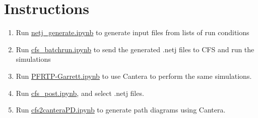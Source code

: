\documentclass{article}
\begin{document}
\section*{Instructions}
\begin{enumerate}
    \item Run \href{netj_generate.ipynb}{netj\_generate.ipynb} to generate input files from lists of run conditions
    \item Run \href{cfs_batchrun.ipynb}{cfs\_batchrun.ipynb} to send the generated .netj files to CFS and run the simulations
    \item Run \href{PFRTP-Garrett.ipynb}{PFRTP-Garrett.ipynb} to use Cantera to perform the same simulations.
    \item Run \href{cfs_post.ipynb}{cfs\_post.ipynb}, and select .netj files.
    \item Run \href{cfs2canteraPD.ipynb}{cfs2canteraPD.ipynb} to generate path diagrams using Cantera.
\end{enumerate}
\end{document}
